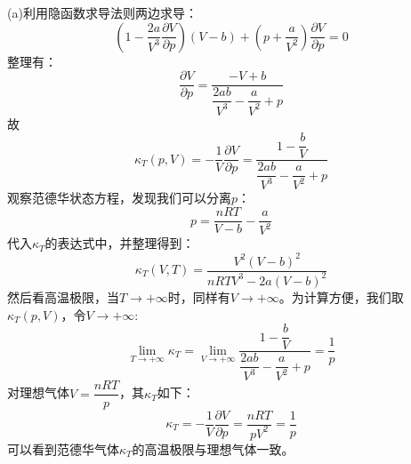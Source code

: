 \begin{solution}
    (a)利用隐函数求导法则两边求导：
    \begin{equation*}
        (1-\frac{2a}{V^{3}}\frac{\partial V}{\partial p})(V-b) + (p+\frac{a}{V^{2}})\frac{\partial V}{\partial p} = 0
    \end{equation*}
    整理有：
    \begin{equation*}
        \frac{\partial V}{\partial p} = \frac{-V+b}{\dfrac{2ab}{V^{3}}-\dfrac{a}{V^{2}}+p}
    \end{equation*}
    故
    \begin{equation*}
        \kappa_T(p,V) = -\frac{1}{V}\frac{\partial V}{\partial p} = \frac{1-\dfrac{b}{V}}{\dfrac{2ab}{V^{3}}-\dfrac{a}{V^{2}}+p}
    \end{equation*}
    观察范德华状态方程，发现我们可以分离$p$：
    \begin{equation*}
        p = \frac{nRT}{V-b}-\frac{a}{V^{2}}
    \end{equation*}
    代入$\kappa_T$的表达式中，并整理得到：
    \begin{equation*}
        \kappa_T(V,T) = \frac{V^{2}(V-b)^{2}}{nRTV^{3}-2a(V-b)^{2}}
    \end{equation*}
    然后看高温极限，当$T\rightarrow +\infty$时，同样有$V\rightarrow +\infty$。为计算方便，我们取$\kappa_{T}(p,V)$，令$V\rightarrow +\infty$:
    \begin{equation*}
        \lim_{T\rightarrow +\infty}\kappa_T = \lim_{V \rightarrow +\infty}\frac{1-\dfrac{b}{V}}{\dfrac{2ab}{V^{3}}-\dfrac{a}{V^{2}}+p}=\frac{1}{p}
    \end{equation*}
    对理想气体$V = \dfrac{nRT}{p}$，其$\kappa_T$如下：
    \begin{equation*}
        \kappa_T = -\frac{1}{V}\frac{\partial V}{\partial p} = \frac{nRT}{pV^{2}} = \frac{1}{p}
    \end{equation*}
    可以看到范德华气体$\kappa_T$的高温极限与理想气体一致。
    \\


\end{solution}
